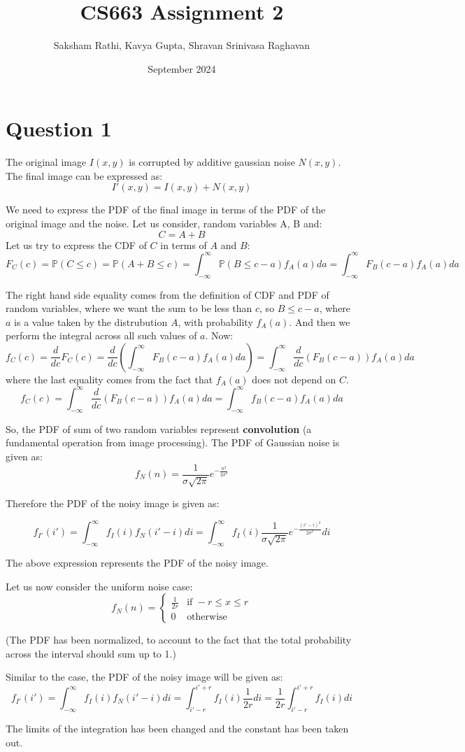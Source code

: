 \documentclass[12pt]{article}
\title{{\bf CS663 Assignment 2}}
\author{Saksham Rathi, Kavya Gupta, Shravan Srinivasa Raghavan}
\date{September 2024}
\begin{document}
\maketitle
\clearpage
\tableofcontents
\clearpage
\section*{Question 1}
The original image $I(x, y)$ is corrupted by additive gaussian noise $N(x, y)$. The final image can be expressed as:
\[I'(x, y) = I(x, y) + N(x, y)\]

We need to express the PDF of the final image in terms of the PDF of the original image and the noise. Let us consider, random variables A, B and:
\[C = A + B\]
Let us try to express the CDF of $C$ in terms of $A$ and $B$:
\[F_C(c) = \mathbb{P}(C \leq c) = \mathbb{P}(A+ B \leq c) = \int_{-\infty}^\infty \mathbb{P}(B \leq c - a)f_A(a)da = \int_{-\infty}^\infty F_B(c-a)f_A(a)da\]

The right hand side equality comes from the definition of CDF and PDF of random variables, where we want the sum to be less than $c$, so $B\leq c-a$, where $a$ is a value taken by the distrubution $A$, with probability $f_A(a)$. And then we perform the integral across all such values of $a$. Now:
\[f_C(c) = \frac{d}{dc}F_C(c) = \frac{d}{dc}(\int_{-\infty}^\infty F_B(c-a)f_A(a)da) = \int_{-\infty}^\infty \frac{d}{dc}(F_B(c-a))f_A(a)da\]
where the last equality comes from the fact that $f_A(a)$ does not depend on $C$.
\[f_C(c) = \int_{-\infty}^\infty \frac{d}{dc}(F_B(c-a))f_A(a)da = \int_{-\infty}^\infty f_B(c-a)f_A(a)da\]

So, the PDF of sum of two random variables represent \textbf{convolution} (a fundamental operation from image processing). The PDF of Gaussian noise is given as:
\[f_N(n) = \frac{1}{\sigma\sqrt{2\pi}}e^{-\frac{n^2}{2\sigma^2}}\]

Therefore the PDF of the noisy image is given as:

\[f_{I'}(i') = \int_{-\infty}^\infty f_I(i)f_N(i'-i)di = \int_{-\infty}^\infty f_I(i)\frac{1}{\sigma\sqrt{2\pi}}e^{-\frac{(i'-i)^2}{2\sigma^2}}di\]

The above expression represents the PDF of the noisy image.


Let us now consider the uniform noise case:
\[f_N(n) = 
\begin{cases} 
    \frac{1}{2r} & \text{if } -r \leq x \leq r \\
    0  & \text{otherwise}
\end{cases}\]

(The PDF has been normalized, to account to the fact that the total probability across the interval should sum up to 1.)


Similar to the case, the PDF of the noisy image will be given as:
\[f_{I'}(i') = \int_{-\infty}^\infty f_I(i)f_N(i'-i)di = \int_{i'-r}^{i'+r} f_I(i)\frac{1}{2r}di = \frac{1}{2r}\int_{i'-r}^{i'+r} f_I(i)di\]


The limits of the integration has been changed and the constant has been taken out.
\end{document}
